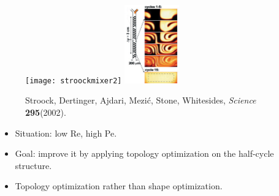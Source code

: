 \documentclass[12pt,t]{beamer}
\begin{document}
\begin{frame}

  \begin{figure}
    \centerline{
     \texttt{[image: stroockmixer2]}
     \includegraphics[width=0.21\textwidth]{stroockcrosssection}
     }
  \end{figure} 
  \vspace{-1cm}
  \begin{figure}
  \tiny{Stroock, Dertinger, Ajdari, Mezi\'c, Stone, Whitesides, \textit{Science} \textbf{295}(2002).} 
  \end{figure}
  \begin{itemize}
     \item Situation: low Re, high Pe.
     \item Goal: improve it by applying topology optimization on the half-cycle structure.
     \item Topology optimization rather than shape optimization. 
  \end{itemize}
\end{frame}
\end{document}
